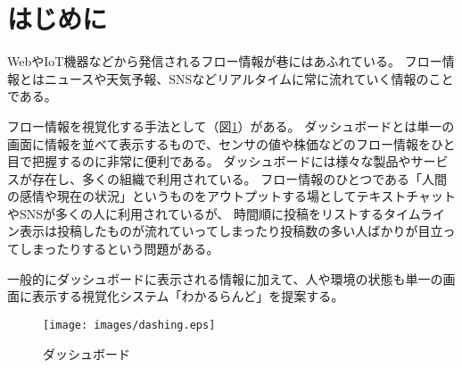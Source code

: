 \section{はじめに}

WebやIoT機器などから発信されるフロー情報が巷にはあふれている。
フロー情報とはニュースや天気予報、SNSなどリアルタイムに常に流れていく情報のことである。

フロー情報を視覚化する手法として（図\ref{dashing}）がある。
ダッシュボードとは単一の画面に情報を並べて表示するもので、センサの値や株価などのフロー情報をひと目で把握するのに非常に便利である。
ダッシュボードには様々な製品やサービスが存在し、多くの組織で利用されている。
フロー情報のひとつである「人間の感情や現在の状況」というものをアウトプットする場としてテキストチャットやSNSが多くの人に利用されているが、
時間順に投稿をリストするタイムライン表示は投稿したものが流れていってしまったり投稿数の多い人ばかりが目立ってしまったりするという問題がある。

一般的にダッシュボードに表示される情報に加えて、人や環境の状態も単一の画面に表示する視覚化システム「わかるらんど」を提案する。

\begin{figure}[h]
\centering
\texttt{[image: images/dashing.eps]}
\caption{ダッシュボード}
\label{dashing}
\end{figure}